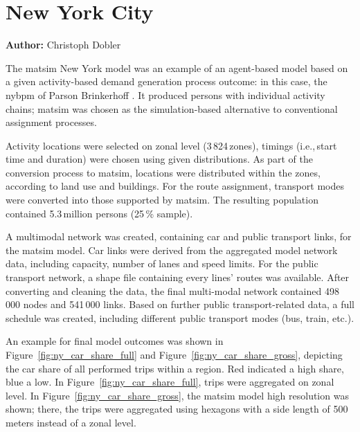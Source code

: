 \section{New York City}
\label{sec:nyc}
\hfill \textbf{Author:} Christoph Dobler


The \gls{matsim} New York model was an example of an agent-based model based on a given activity-based demand generation process outcome: in this case, the \gls{nybpm} of Parson Brinkerhoff \citep[][]{VovshaEtAl_TRR_2002, ParsonsBrinckerhoff_ResRep_NYBPM_2005, ParsonsBrinckerhoff_ResRep_NYBPM_2009}. It produced persons with individual activity chains; \gls{matsim} was chosen as the simulation-based alternative to conventional assignment processes.

Activity locations were selected on zonal level (3\,824\,zones), timings (i.e.,\,start time and duration) were chosen using given distributions. As part of the conversion process to \gls{matsim}, locations were distributed within the zones, according to land use and buildings. For the route assignment, transport modes were converted into those supported by \gls{matsim}. The resulting population contained 5.3\,million persons (25\,\% sample).

A \gls{multimodal} network was created, containing car and public transport links, for the \gls{matsim} model. Car links were derived from the aggregated model network data, including capacity, number of lanes and speed limits. For the public transport network, a shape file containing every lines' routes was available. After converting and cleaning the data, the final multi-modal network contained 498\,000 nodes and 541\,000 links. Based on further public transport-related data, a full schedule was created, including different public transport modes (bus, train, etc.).

An example for final model outcomes was shown in Figure~\ref{fig:ny_car_share_full} and Figure~\ref{fig:ny_car_share_gross}, depicting the car share of all performed trips within a region. Red indicated a high share, blue a low. In Figure~\ref{fig:ny_car_share_full}, trips were aggregated on zonal level. In Figure~\ref{fig:ny_car_share_gross}, the \gls{matsim} model high resolution was shown; there, the trips were aggregated using hexagons with a side length of 500\,meters instead of a zonal level.

